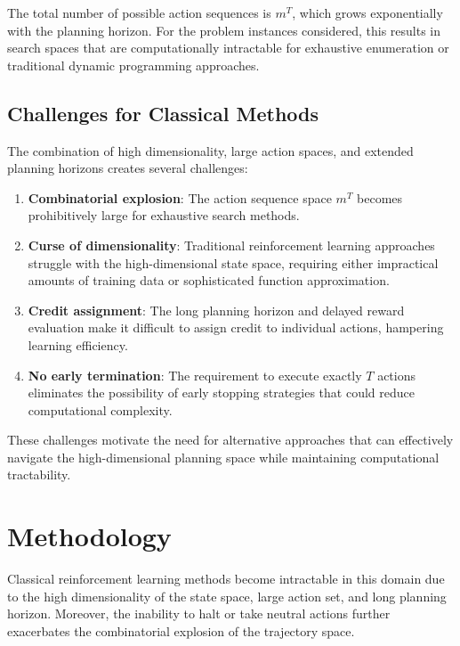 \documentclass[11pt, a4paper]{article}
\begin{document}
The total number of possible action sequences is $m^T$, which grows exponentially with the planning horizon. For the problem instances considered, this results in search spaces that are computationally intractable for exhaustive enumeration or traditional dynamic programming approaches.

\subsection{Challenges for Classical Methods}

The combination of high dimensionality, large action spaces, and extended planning horizons creates several challenges:

\begin{enumerate}
\item \textbf{Combinatorial explosion}: The action sequence space $m^T$ becomes prohibitively large for exhaustive search methods.

\item \textbf{Curse of dimensionality}: Traditional reinforcement learning approaches struggle with the high-dimensional state space, requiring either impractical amounts of training data or sophisticated function approximation.

\item \textbf{Credit assignment}: The long planning horizon and delayed reward evaluation make it difficult to assign credit to individual actions, hampering learning efficiency.

\item \textbf{No early termination}: The requirement to execute exactly $T$ actions eliminates the possibility of early stopping strategies that could reduce computational complexity.
\end{enumerate}

These challenges motivate the need for alternative approaches that can effectively navigate the high-dimensional planning space while maintaining computational tractability.
	\section{Methodology}

Classical reinforcement learning methods become intractable in this domain due to the high dimensionality of the state space, large action set, and long planning horizon. Moreover, the inability to halt or take neutral actions further exacerbates the combinatorial explosion of the trajectory space.
\end{document}
